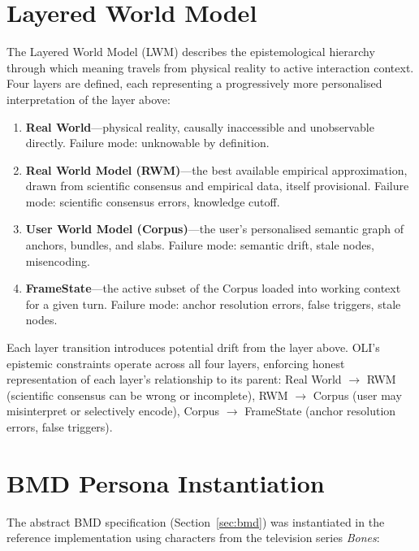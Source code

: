 \documentclass[11pt,a4paper]{article}
\begin{document}
\appendix

\section{Layered World Model}
\label{app:lwm}

The Layered World Model (LWM) describes the epistemological hierarchy through which meaning travels from physical reality to active interaction context.
Four layers are defined, each representing a progressively more personalised interpretation of the layer above:

\begin{enumerate}[leftmargin=2em]
    \item \textbf{Real World}---physical reality, causally inaccessible and unobservable directly. Failure mode: unknowable by definition.
    \item \textbf{Real World Model (RWM)}---the best available empirical approximation, drawn from scientific consensus and empirical data, itself provisional. Failure mode: scientific consensus errors, knowledge cutoff.
    \item \textbf{User World Model (Corpus)}---the user's personalised semantic graph of anchors, bundles, and slabs. Failure mode: semantic drift, stale nodes, misencoding.
    \item \textbf{FrameState}---the active subset of the Corpus loaded into working context for a given turn. Failure mode: anchor resolution errors, false triggers, stale nodes.
\end{enumerate}

Each layer transition introduces potential drift from the layer above.
OLI's epistemic constraints operate across all four layers, enforcing honest representation of each layer's relationship to its parent:
Real World $\to$ RWM (scientific consensus can be wrong or incomplete),
RWM $\to$ Corpus (user may misinterpret or selectively encode),
Corpus $\to$ FrameState (anchor resolution errors, false triggers).

\section{BMD Persona Instantiation}
\label{app:bmd_instantiation}

The abstract BMD specification (Section~\ref{sec:bmd}) was instantiated in the reference implementation using characters from the television series \emph{Bones}:
\end{document}
